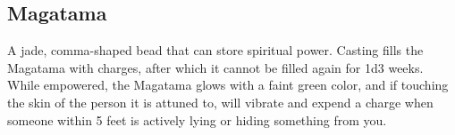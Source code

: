 \subsection{Magatama}
\label{items:magatama}
A jade, comma-shaped bead that can store spiritual power. Casting  fills the Magatama with charges, after which it cannot be filled again for 1d3 weeks. While empowered, the Magatama glows with a faint green color, and if touching the skin of the person it is attuned to, will vibrate and expend a charge when someone within 5 feet is actively lying or hiding something from you.